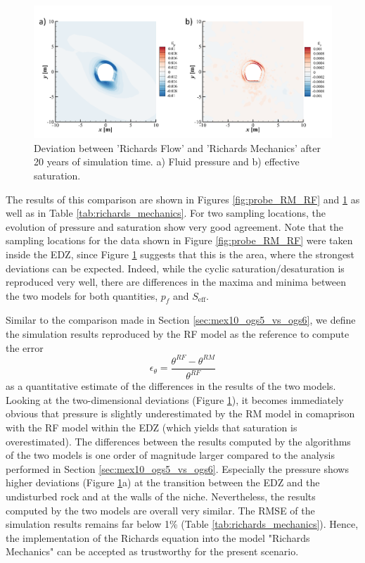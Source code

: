 \begin{figure}[t]
\includegraphics[width=\textwidth, trim=0.5cm  0.0cm 0 0.0cm, clip]{./figures/MEX10_cf_RF_RM_2d.png}
\caption{Deviation between 'Richards Flow' and 'Richards Mechanics' after 20 years of simulation time. a) Fluid pressure and b) effective saturation.}
\label{fig:richards_mechancis}
\end{figure}

The results of this comparison are shown in Figures \ref{fig:probe_RM_RF} and \ref{fig:richards_mechancis} as well as in Table \ref{tab:richards_mechanics}. For two sampling locations, the evolution of pressure and saturation show very good agreement. Note that the sampling locations for the data shown in Figure \ref{fig:probe_RM_RF} were taken inside the EDZ, since Figure \ref{fig:richards_mechancis} suggests that this is the area, where the strongest deviations can be expected. Indeed, while the cyclic saturation/desaturation is reproduced very well, there are differences in the maxima and minima between the two models for both quantities, $p_f$ and $S_\text{eff}$.  

Similar to the comparison made in Section \ref{sec:mex10_ogs5_vs_ogs6}, we define the simulation results reproduced by the RF model as the reference to compute the error
%
\begin{equation}\label{eq:error_rm_rf}
\epsilon_\theta = \frac{\theta^{RF}-\theta^{RM}}{\theta^{RF}}
\end{equation}
% 
as a quantitative estimate of the differences in the results of the two models. Looking at the two-dimensional deviations (Figure \ref{fig:richards_mechancis}), it becomes immediately obvious that pressure is slightly underestimated by the RM model in comaprison with the RF model within the EDZ (which yields that saturation is overestimated). The differences between the results computed by the algorithms of the two models is one order of magnitude larger compared to the analysis performed in Section \ref{sec:mex10_ogs5_vs_ogs6}. Especially the pressure shows higher deviations (Figure \ref{fig:richards_mechancis}a) at the transition between the EDZ and the undisturbed rock and at the walls of the niche. Nevertheless, the results computed by the two models are overall very similar. The RMSE of the simulation results remains far below 1\% (Table \ref{tab:richards_mechanics}). Hence, the implementation of the Richards equation into the model "Richards Mechanics" can be accepted as trustworthy for the present scenario. 

